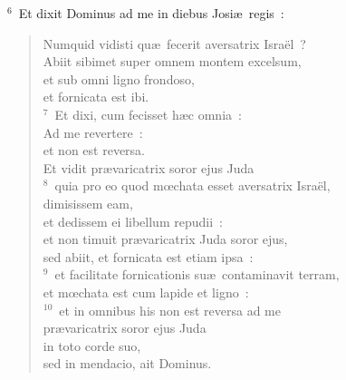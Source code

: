 ${}^{6}$~Et dixit Dominus ad me in diebus Josi\ae\ regis~: \begin{verse}Numquid vidisti qu\ae\ fecerit aversatrix Isra\"el~?\\ Abiit sibimet super omnem montem excelsum,\\ et sub omni ligno frondoso,\\ et fornicata est ibi.\\
${}^{7}$~Et dixi, cum fecisset h\ae c omnia~:\\ Ad me revertere~:\\ et non est reversa.\\ Et vidit pr\ae varicatrix soror ejus Juda\\
${}^{8}$~quia pro eo quod mœchata esset aversatrix Isra\"el,\\ dimisissem eam,\\ et dedissem ei libellum repudii~:\\ et non timuit pr\ae varicatrix Juda soror ejus,\\ sed abiit, et fornicata est etiam ipsa~:\\
${}^{9}$~et facilitate fornicationis su\ae\ contaminavit terram,\\ et mœchata est cum lapide et ligno~:\\
${}^{10}$~et in omnibus his non est reversa ad me\\ pr\ae varicatrix soror ejus Juda\\ in toto corde suo,\\ sed in mendacio, ait Dominus.\end{verse}


